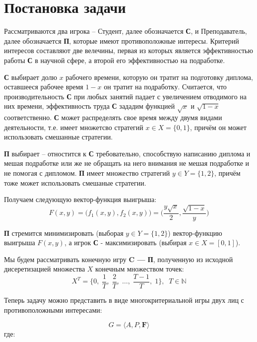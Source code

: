 \section{Постановка задачи}

Рассматриваются два игрока -- Студент, далее обозначается \textbf{С},
и Преподаватель, далее обозначается \textbf{П}, которые имеют противоположные интересы.
Критерий интересов составляют две велечины, первая из которых является эффективностью
работы \textbf{С} в научной сфере, а второй его эффективностью на подработке.

\textbf{С} выбирает долю $x$ рабочего времени, которую он тратит на подготовку
диплома, оставшееся рабочее время $1-x$ он тратит на подработку. Считается, что производительность \textbf{С} при любых занятий падает с увеличением 
отводимого на них времени, эффективность труда \textbf{С} зададим функцией $\sqrt{x}$
и $\sqrt{1-x}$ соответственно. \textbf{С} может распределять свое время между двумя 
видами деятельности, т.е. имеет множетсво стратегий $x\in X = \{0, 1\}$, 
причём он может использовать смешанные стратегии.

\textbf{П} выбирает -- отностится к \textbf{С} требовательно, способствую 
написанию диплома и мешая подработке или же не обращать на него внимания не 
мешая подработке и не помогая с дипломом. \textbf{П} имеет множество стратегий 
$y \in Y=\{1, 2\}$, причём тоже может использовать смешаные стратегии.

Получаем следующую вектор-функция выигрыша:
\begin{equation}
	F(x, y)=
	\big(f_1(x,y), f_2(x,y)\big) =
	\Big(
		\frac{y\sqrt{x}}2,
		\frac{\sqrt{1-x}}y
	\Big)
	\label{eq:player_criterion}
\end{equation}

\textbf{П} стремится минимизировать (выборая $y \in Y = \{1,2\}$)
вектор-функцию выигрыша $F(x, y)$, а игрок \textbf{С} - максимизировать
 (выбирая $x \in X=[0,1]$).

Мы будем рассматривать конечную игру \textbf{C --- П}, полученную из исходной дисеретизацией множества $X$ конечным множеством точек:
$$
	X^T = \{
		0, \; 
		\frac{1}{T}, \; 
		\frac{2}{T}, \; 
		\ldots, \; 
		\frac{T-1}{T}, \;
		1
	\}, \;\; T \in \mathbb{N}
$$

Теперь задачу можно представить в виде многокритериальной игры двух лиц 
с противоположными интересами:


\begin{equation}
	G = \big \langle A, P, \textbf{F} \big \rangle
\end{equation}
	где: 
 
